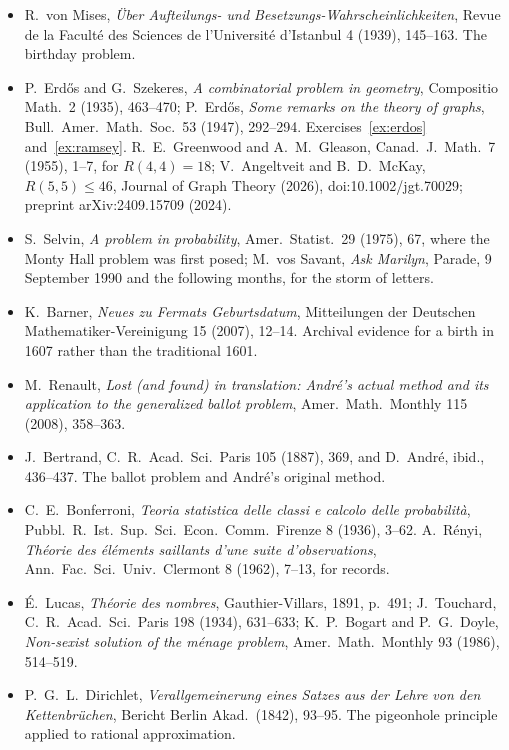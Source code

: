 \begin{itemize}
\item R.~von Mises, \emph{\"Uber Aufteilungs- und Besetzungs-\allowbreak Wahrscheinlichkeiten}, Revue de la Facult\'e des Sciences de l'Universit\'e d'Istanbul 4 (1939), 145--163. The birthday problem.
\item P.~Erd\H{o}s and G.~Szekeres, \emph{A combinatorial problem in geometry}, Compositio Math.\ 2 (1935), 463--470; P.~Erd\H os, \emph{Some remarks on the theory of graphs}, Bull.\ Amer.\ Math.\ Soc.\ 53 (1947), 292--294. Exercises~\ref{ex:erdos} and~\ref{ex:ramsey}. R.~E.~Greenwood and A.~M.~Gleason, Canad.\ J.\ Math.\ 7 (1955), 1--7, for $R(4,4)=18$; V.~Angeltveit and B.~D.~McKay, \emph{$R(5,5)\le46$}, Journal of Graph Theory (2026), doi:10.1002/jgt.70029; preprint arXiv:2409.15709 (2024).
\item S.~Selvin, \emph{A problem in probability}, Amer.\ Statist.\ 29 (1975), 67, where the Monty Hall problem was first posed; M.~vos Savant, \emph{Ask Marilyn}, Parade, 9 September 1990 and the following months, for the storm of letters.
\item K.~Barner, \emph{Neues zu Fermats Geburtsdatum}, Mitteilungen der Deutschen Mathematiker-Vereinigung 15 (2007), 12--14. Archival evidence for a birth in 1607 rather than the traditional 1601.
\item M.~Renault, \emph{Lost (and found) in translation: Andr\'e's actual method and its application to the generalized ballot problem}, Amer.\ Math.\ Monthly 115 (2008), 358--363.
\item J.~Bertrand, C.\ R.\ Acad.\ Sci.\ Paris 105 (1887), 369, and D.~Andr\'e, ibid., 436--437. The ballot problem and Andr\'e's original method.
\item C.~E.~Bonferroni, \emph{Teoria statistica delle classi e calcolo delle probabilit\`a}, Pubbl.\ R.\ Ist.\ Sup.\ Sci.\ Econ.\ Comm.\ Firenze 8 (1936), 3--62. A.~R\'enyi, \emph{Th\'eorie des \'el\'ements saillants d'une suite d'observations}, Ann.\ Fac.\ Sci.\ Univ.\ Clermont 8 (1962), 7--13, for records.
\item \'E.~Lucas, \emph{Th\'eorie des nombres}, Gauthier-Villars, 1891, p.~491; J.~Touchard, C.\ R.\ Acad.\ Sci.\ Paris 198 (1934), 631--633; K.~P.~Bogart and P.~G.~Doyle, \emph{Non-sexist solution of the m\'enage problem}, Amer.\ Math.\ Monthly 93 (1986), 514--519.
\item P.~G.~L.~Dirichlet, \emph{Verallgemeinerung eines Satzes aus der Lehre von den Kettenbr\"uchen}, Bericht Berlin Akad.\ (1842), 93--95. The pigeonhole principle applied to rational approximation.
\end{itemize}
